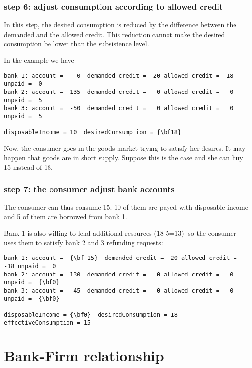 \documentclass{article}
\begin{document}
\subsubsection*{step 6: adjust consumption according to allowed credit}

In this step, the desired consumption is reduced by the difference between the demanded and the allowed credit. This reduction cannot make the desired consumption be lower than the subsistence level.

In the example we have

\begin{Verbatim}[commandchars=\\\{\}]
bank 1: account =    0  demanded credit = -20 allowed credit = -18 unpaid =  0
bank 2: account = -135  demanded credit =   0 allowed credit =   0 unpaid =  5
bank 3: account =  -50  demanded credit =   0 allowed credit =   0 unpaid =  5

disposableIncome = 10  desiredConsumption = {\bf18}
\end{Verbatim}

Now, the consumer goes in the goods market trying to satisfy her desires. It may happen that goods are in short supply. Suppose this is the case and she can buy 15 instead of 18. 

\subsubsection*{step 7: the consumer adjust bank accounts}

The consumer can thus consume 15. 10 of them are payed with disposable income and 5 of them are borrowed from bank 1. 

Bank 1 is also willing to lend additional resources (18-5=13), so the consumer uses them to satisfy bank 2 and 3 refunding requests:

\begin{Verbatim}[commandchars=\\\{\}]
bank 1: account =  {\bf-15}  demanded credit = -20 allowed credit = -18 unpaid =  0
bank 2: account = -130  demanded credit =   0 allowed credit =   0 unpaid =  {\bf0}
bank 3: account =  -45  demanded credit =   0 allowed credit =   0 unpaid =  {\bf0}

disposableIncome = {\bf0}  desiredConsumption = 18 effectiveConsumption = 15
\end{Verbatim}



\section{Bank-Firm relationship}
\end{document}

